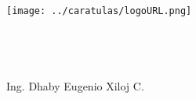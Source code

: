 \begin{titlepage}

\vspace*{\fill}
\begin{center}
\texttt{[image: ../caratulas/logoURL.png]}~
\\[1cm]
\\
\\
\\[1cm]
\text{\large \nCurso} \\
Ing. Dhaby Eugenio Xiloj C.
\\[2cm]
\HBar \\[0.5cm]
\text{\LARGE\cTituloA}
\\[1cm]
\text{\LARGE\cTituloB} \\[0.5cm]
\HBar \\[3cm]

\cFecha
\end{center}
\vspace*{\fill}
\end{titlepage}
